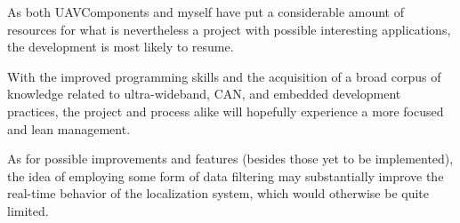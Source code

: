 
As both UAVComponents and myself have put a considerable amount of resources for what is nevertheless a project with possible interesting applications, the development is most likely to resume.

With the improved programming skills and the acquisition of a broad corpus of knowledge related to ultra-wideband, CAN, and embedded development practices, the project and process alike will hopefully experience a more focused and lean management.

As for possible improvements and features (besides those yet to be implemented), the idea of employing some form of data filtering may substantially improve the real-time behavior of the localization system, which would otherwise be quite limited.
